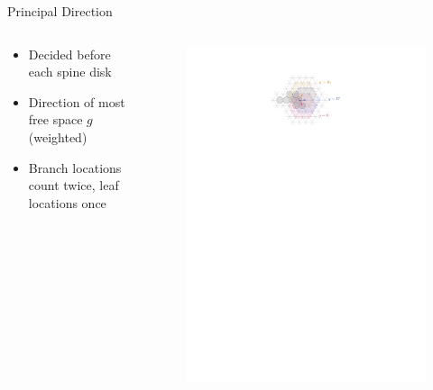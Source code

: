 \documentclass[aspectratio=169,notes]{beamer}
\begin{document}
\begin{frame}{Principal Direction}

\begin{columns}
\begin{column}{0.4\textwidth}
    \begin{itemize}
    \item Decided before each spine disk
    \item Direction of most free space $g$ (weighted)
    \item Branch locations count twice, leaf locations once
    \end{itemize}
\end{column}
\begin{column}{0.4\textwidth}
\begin{figure}
    \centering
    \includegraphics{ch5_principaldirection.pdf}
\end{figure}
\end{column}
\end{columns}

\end{frame}
\end{document}
